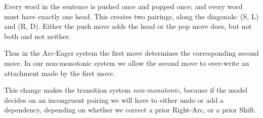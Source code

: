 \documentclass[11pt,letterpaper]{article}
\newcommand{\maybe}[1]{\textcolor{gray}{#1}}
\begin{document}
Every word in the sentence is pushed once and popped once; and every
word must have exactly one head. This creates two pairings, along the
diagonals: (S, L) and (R, D).
Either the push move adds the head or the pop move does, but not both and not neither.

Thus in the Arc-Eager system the first move determines the corresponding second move.
In our non-monotonic system we allow the second move to over-write an attachment made
by the first move.

This change makes the transition system \emph{non-monotonic}, because if the model decides
on an incongruent pairing
we will have to either undo or add a
dependency, depending on whether we correct a prior Right-Arc, or a prior Shift.


\end{document}
